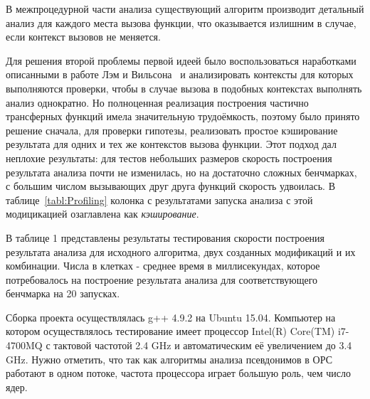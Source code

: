 В межпроцедурной части анализа существующий алгоритм производит детальный анализ для каждого места вызова функции, что оказывается излишним в случае, если контекст вызовов не меняется.

Для решения второй проблемы первой идеей было воспользоваться наработками описанными в работе Лэм и Вильсона~\autocite{WilsonLamSIGPLAN95} и анализировать контексты для которых выполняются проверки, чтобы в случае вызова в подобных контекстах выполнять анализ однократно. Но полноценная реализация построения частично трансферных функций имела значительную трудоёмкость, поэтому было принято решение сначала, для проверки гипотезы, реализовать простое кэширование результата для одних и тех же контекстов вызова функции. Этот подход дал неплохие результаты: для тестов небольших размеров скорость построения результата анализа почти не изменилась, но на достаточно сложных бенчмарках, с большим числом вызывающих друг друга функций скорость удвоилась. В таблице~\ref{tabl:Profiling} колонка с результатами запуска анализа с этой модицикацией озаглавлена как \textit{кэширование}.

\Conc

В таблице 1 представлены результаты тестирования скорости построения результата анализа для исходного алгоритма, двух созданных модификаций и их комбинации. Числа в клетках - среднее время в миллисекундах, которое потребовалось на построение результата анализа для соответствующего бенчмарка на 20 запусках.

Сборка проекта осуществлялась g++ 4.9.2 на Ubuntu 15.04. Компьютер на котором осуществлялось тестирование имеет процессор Intel(R) Core(TM) i7-4700MQ с тактовой частотой 2.4 GHz и автоматическим её увеличением до 3.4 GHz. Нужно отметить, что так как алгоритмы анализа псевдонимов в ОРС работают в одном потоке, частота процессора играет большую роль, чем число ядер.

